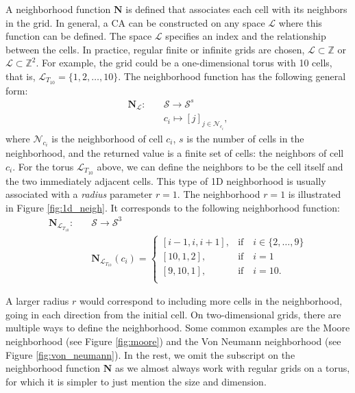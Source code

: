A neighborhood function $\boldsymbol{N}$ is defined that associates each cell
with its neighbors in the grid. In general, a \ac{CA} can be constructed on any
space $\mathcal{L}$ where this function can be defined. The space $\mathcal{L}$ specifies an
index and the relationship between the cells. In practice, regular finite or
infinite grids are chosen, $\mathcal{L} \subset \mathbb{Z}$ or $\mathcal{L} \subset \mathbb{Z}^{2}$. For example, the grid could
be a one-dimensional torus with 10 cells, that is,
$\mathcal{L}_{{T_{10}}} = \{1, 2, \ldots, 10 \}$. The neighborhood function has the following
general form:
\begin{equation}
  \begin{aligned}
\boldsymbol{N}_{\mathcal{L}} :\quad & \mathcal{S} \rightarrow \mathcal{S}^{s}\\
&{c_i} \mapsto [{j}]_{j\in \mathcal{N}_{c_{i}}},
  \end{aligned}
\end{equation}
where $\mathcal{N}_{c_{i}}$ is the neighborhood of cell $c_{i}$, $s$ is the
number of cells in the neighborhood, and the returned value is a finite set of
cells: the neighbors of cell $c_{i}$. For the torus $\mathcal{L}_{T_{10}}$
above, we can define the neighbors to be the cell itself and the two immediately
adjacent cells. This type of 1D neighborhood is usually associated with a
\emph{radius} parameter $r = 1$. The neighborhood $r=1$ is illustrated in Figure
\ref{fig:1d_neigh}. It corresponds to the following neighborhood function:
\begin{equation}
  \begin{aligned}
\boldsymbol{N}_{\mathcal{L}_{T_{10}}} :\quad & \mathcal{S} \rightarrow \mathcal{S}^{3} \\
&\boldsymbol{N}_{\mathcal{L}_{T_{10}}}(c_{i}) = \begin{cases}
                      [{i - 1}, {i}, {i + 1}],& \text{if}\quad i \in \{2,\ldots , 9\}\\
                       [{10}, {1}, {2}], & \text{if} \quad i = 1 \\
                       [{9}, {10}, {1}], & \text{if} \quad i = 10. \\
                    \end{cases}
  \end{aligned}
  \label{eq:torus_index}
\end{equation}

A larger radius $r$ would correspond to including more cells in the
neighborhood, going in each direction from the initial cell. On two-dimensional
grids, there are multiple ways to define the neighborhood. Some common examples
are the Moore neighborhood (see Figure \ref{fig:moore}) and the Von Neumann
neighborhood (see Figure \ref{fig:von_neumann}). In the rest, we omit the
subscript on the neighborhood function $\boldsymbol{N}$ as we almost always work
with regular grids on a torus, for which it is simpler to just mention the size
and dimension.

